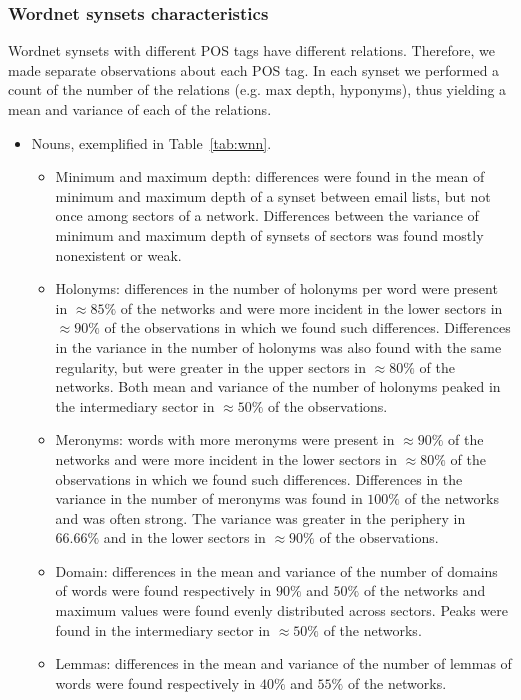 \subsubsection{Wordnet synsets characteristics}\label{subsec:wn1}
Wordnet synsets with different POS tags have different relations.
Therefore, we made separate observations about each POS tag.
In each synset we performed a count of the number of the relations (e.g. max depth, hyponyms),
thus yielding a mean and variance of each of the relations.
\begin{itemize}
	\item Nouns, exemplified in Table~\ref{tab:wnn}.
		\begin{itemize}
			\item Minimum and maximum depth: 
				differences were found in the mean of minimum and maximum depth of a synset between email lists,
		but not once among sectors of a network.
		Differences between the variance of minimum and maximum depth of synsets of sectors was found mostly nonexistent or weak.
			\item Holonyms:
				differences in the number of holonyms per word were present in $\approx 85\%$ of the networks and were
		more incident in the lower sectors in $\approx 90\%$ of the observations in which we found such differences.
		Differences in the variance in the number of holonyms was also found with the same regularity,
		but were greater in the upper sectors in $\approx 80\%$ of the networks.
				Both mean and variance of the number of holonyms peaked in the intermediary sector in $\approx50\%$ of the observations.
			\item Meronyms:
				words with more meronyms were present in $\approx 90\%$ of the networks and were
		more incident in the lower sectors in $\approx 80\%$ of the observations in which we found such differences.
			Differences in the variance in the number of meronyms was found in $100\%$ of the networks and was often strong.
				The variance was greater in the periphery in $66.66\%$ and in the lower sectors in $\approx 90\%$ of the observations.
			\item Domain:
				differences in the mean and variance of the number of domains of words were found respectively in $90\%$ and $50\%$ of the networks and maximum values were found evenly distributed across sectors.
				Peaks were found in the intermediary sector in $\approx 50\%$ of the networks.
			\item Lemmas:
				differences in the mean and variance of the number of lemmas of words were found respectively in $40\%$ and $55\%$ of the networks.

\end{itemize}
\end{itemize}
